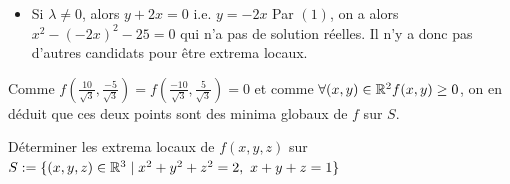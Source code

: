 \begin{resolution}
\begin{itemize}
    et $(1)$ devient alors $x^2 - (\frac{-x}{2})^2 - 25 = 0$ ce qui nous donne après calcul,
    $x = \pm \frac{10}{\sqrt3}$
    On vient de trouver deux candidats pour être extrema locaux.
    $$(\frac{10}{\sqrt3},\frac{-5}{\sqrt3})$$ et $$(\frac{-10}{\sqrt3},\frac{5}{\sqrt3})$$
     \item Si $\lambda\ne 0$, alors $y+2x = 0$ i.e. $y = -2x$
     Par $(1)$, on a alors $x^2 - (-2x)^2 - 25 = 0$ qui n'a pas de solution réelles.
     Il n'y a donc pas d'autres candidats pour être extrema locaux.
     \end{itemize}
     Comme $f(\frac{10}{\sqrt3},\frac{-5}{\sqrt3}) = f(\frac{-10}{\sqrt3},\frac{5}{\sqrt3}) = 0$
     et comme $\forall (x,y) \in \mathbb{R}^2 f(x,y) \ge 0 $,
     on en déduit que ces deux points sont des minima globaux de $f$ sur $S$.
\end{resolution}
\begin{exemple}
    Déterminer les extrema locaux de $f(x,y,z)$ sur $S:=\{(x,y,z)\in\R^3\mid x^2+y^2+z^2= 2,\ x+y+z = 1\}$
\end{exemple}
